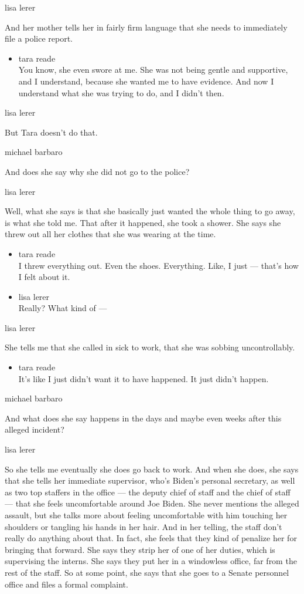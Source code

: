 lisa lerer

And her mother tells her in fairly firm language that she needs to
immediately file a police report.

\begin{itemize}
\tightlist
\item
  tara reade\\
  You know, she even swore at me. She was not being gentle and
  supportive, and I understand, because she wanted me to have evidence.
  And now I understand what she was trying to do, and I didn't then.
\end{itemize}

lisa lerer

But Tara doesn't do that.

michael barbaro

And does she say why she did not go to the police?

lisa lerer

Well, what she says is that she basically just wanted the whole thing to
go away, is what she told me. That after it happened, she took a shower.
She says she threw out all her clothes that she was wearing at the time.

\begin{itemize}
\item
  tara reade\\
  I threw everything out. Even the shoes. Everything. Like, I just ---
  that's how I felt about it.
\item
  lisa lerer\\
  Really? What kind of ---
\end{itemize}

lisa lerer

She tells me that she called in sick to work, that she was sobbing
uncontrollably.

\begin{itemize}
\tightlist
\item
  tara reade\\
  It's like I just didn't want it to have happened. It just didn't
  happen.
\end{itemize}

michael barbaro

And what does she say happens in the days and maybe even weeks after
this alleged incident?

lisa lerer

So she tells me eventually she does go back to work. And when she does,
she says that she tells her immediate supervisor, who's Biden's personal
secretary, as well as two top staffers in the office --- the deputy
chief of staff and the chief of staff --- that she feels uncomfortable
around Joe Biden. She never mentions the alleged assault, but she talks
more about feeling uncomfortable with him touching her shoulders or
tangling his hands in her hair. And in her telling, the staff don't
really do anything about that. In fact, she feels that they kind of
penalize her for bringing that forward. She says they strip her of one
of her duties, which is supervising the interns. She says they put her
in a windowless office, far from the rest of the staff. So at some
point, she says that she goes to a Senate personnel office and files a
formal complaint.

